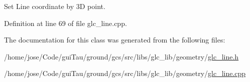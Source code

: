 Set Line coordinate by 3\-D point. 



Definition at line 69 of file glc\-\_\-line.\-cpp.



The documentation for this class was generated from the following files\-:\begin{DoxyCompactItemize}
\item 
/home/jose/\-Code/gui\-Tau/ground/gcs/src/libs/glc\-\_\-lib/geometry/\hyperlink{glc__line_8h}{glc\-\_\-line.\-h}\item 
/home/jose/\-Code/gui\-Tau/ground/gcs/src/libs/glc\-\_\-lib/geometry/\hyperlink{glc__line_8cpp}{glc\-\_\-line.\-cpp}\end{DoxyCompactItemize}
